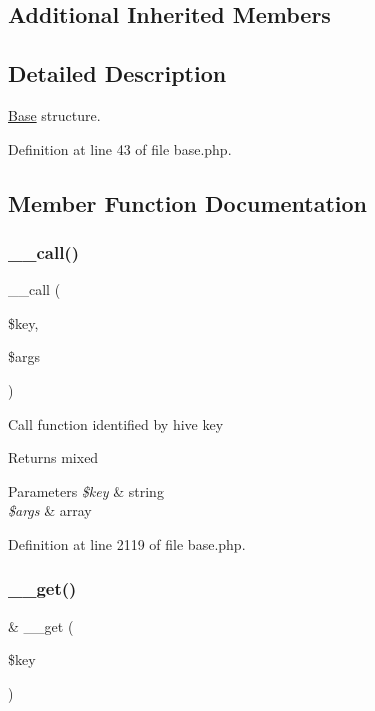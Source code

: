 \subsection*{Additional Inherited Members}


\subsection{Detailed Description}
\hyperlink{class_base}{Base} structure. 

Definition at line 43 of file base.\+php.



\subsection{Member Function Documentation}
\hypertarget{class_base_a12381dd8315ac26000fdf6b9b0735321}{}\label{class_base_a12381dd8315ac26000fdf6b9b0735321} 
\subsubsection{\texorpdfstring{\+\_\+\+\_\+call()}{\_\_call()}}
{\footnotesize\ttfamily \+\_\+\+\_\+call (\begin{DoxyParamCaption}\item[{}]{\$key,  }\item[{}]{\$args }\end{DoxyParamCaption})}

Call function identified by hive key \begin{DoxyReturn}{Returns}
mixed 
\end{DoxyReturn}

\begin{DoxyParams}{Parameters}
{\em \$key} & string \\
\hline
{\em \$args} & array \\
\hline
\end{DoxyParams}


Definition at line 2119 of file base.\+php.

\hypertarget{class_base_ae23a2c24bd42a7be642cdb71b58dbc5a}{}\label{class_base_ae23a2c24bd42a7be642cdb71b58dbc5a} 
\subsubsection{\texorpdfstring{\+\_\+\+\_\+get()}{\_\_get()}}
{\footnotesize\ttfamily \& \+\_\+\+\_\+get (\begin{DoxyParamCaption}\item[{}]{\$key }\end{DoxyParamCaption})}

